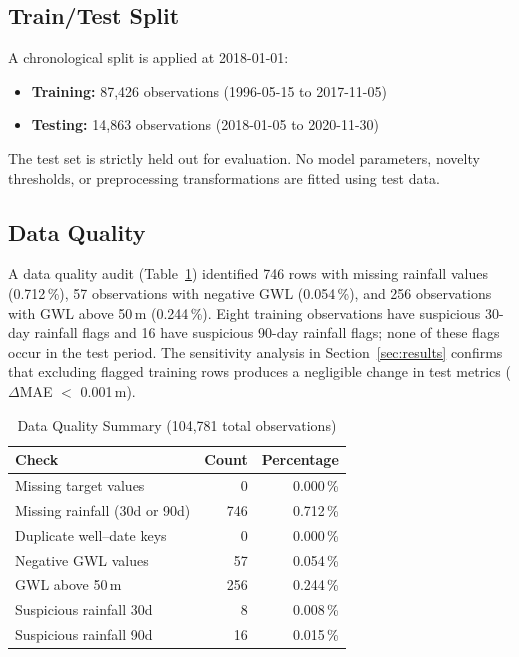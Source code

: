 \documentclass[conference]{IEEEtran}
\begin{document}
\subsection{Train/Test Split}

A chronological split is applied at 2018-01-01:

\begin{itemize}
  \item \textbf{Training:} 87{,}426 observations (1996-05-15 to 2017-11-05)
  \item \textbf{Testing:} 14{,}863 observations (2018-01-05 to 2020-11-30)
\end{itemize}

The test set is strictly held out for evaluation.
No model parameters, novelty thresholds, or preprocessing transformations
are fitted using test data.

\subsection{Data Quality}

A data quality audit (Table~\ref{tab:data_quality}) identified 746 rows
with missing rainfall values (0.712\,\%), 57 observations with negative
GWL (0.054\,\%), and 256 observations with GWL above 50\,m (0.244\,\%).
Eight training observations have suspicious 30-day rainfall flags and 16
have suspicious 90-day rainfall flags; none of these flags occur in the
test period.
The sensitivity analysis in Section~\ref{sec:results} confirms that
excluding flagged training rows produces a negligible change in test
metrics ($\Delta$MAE $<$ 0.001\,m).

\begin{table}[htbp]
\centering
\caption{Data Quality Summary (104,781 total observations)}
\label{tab:data_quality}
\begin{tabular}{@{}lrr@{}}
\toprule
\textbf{Check} & \textbf{Count} & \textbf{Percentage} \\
\midrule
Missing target values & 0 & 0.000\,\% \\
Missing rainfall (30d or 90d) & 746 & 0.712\,\% \\
Duplicate well--date keys & 0 & 0.000\,\% \\
Negative GWL values & 57 & 0.054\,\% \\
GWL above 50\,m & 256 & 0.244\,\% \\
Suspicious rainfall 30d & 8 & 0.008\,\% \\
Suspicious rainfall 90d & 16 & 0.015\,\% \\
\bottomrule
\end{tabular}
\end{table}
\end{document}
